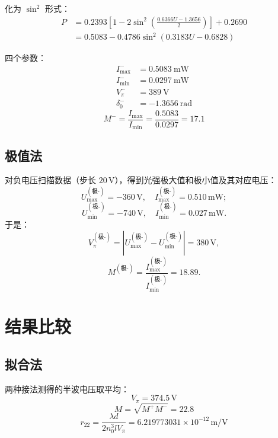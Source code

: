 \documentclass[10pt,twocolumn,a4paper]{article}
\begin{document}
	化为 $\sin^2$ 形式：
	\begin{equation}
		\begin{aligned}
			P &= 0.2393\left[1 - 2\sin^2\left(\frac{0.6366U - 1.3656}{2}\right)\right] + 0.2690 \\
			&= 0.5083 - 0.4786\sin^2(0.3183U - 0.6828)
		\end{aligned}
	\end{equation}
	
	四个参数：
	\begin{align}
		I_{\max}^- &= 0.5083\ \text{mW} \\
		I_{\min}^- &= 0.0297\ \text{mW} \\
		V_\pi^- &= 389\ \text{V} \\
		\delta_0^- &= -1.3656\ \text{rad}
	\end{align}
	\begin{equation}
		M^- = \frac{I_{\max}}{I_{\min}} = \frac{0.5083}{0.0297}=17.1
	\end{equation}
	
	\subsection{极值法}
	对负电压扫描数据（步长 \(20\,\text{V}\)），得到光强极大值和极小值及其对应电压：
	\begin{equation}
		U_{\text{max}}^{(\text{极-})} = -360\,\text{V},\quad I_{\text{max}}^{(\text{极-})} = 0.510\,\text{mW};
	\end{equation}
	\begin{equation}
		U_{\text{min}}^{(\text{极-})} = -740\,\text{V},\quad I_{\text{min}}^{(\text{极-})} = 0.027\,\text{mW}.
	\end{equation}
	于是：
	\begin{equation}
		V_{\pi}^{(\text{极-})} = \left| U_{\text{max}}^{(\text{极-})} - U_{\text{min}}^{(\text{极-})} \right| = 380\,\text{V},
	\end{equation}
	\begin{equation}
		M^{(\text{极-})} = \frac{I_{\text{max}}^{(\text{极-})}}{I_{\text{min}}^{(\text{极-})}} = 18.89.
	\end{equation}
	
	\section{结果比较}\label{sec:compare}
	\subsection{拟合法}
	两种接法测得的半波电压取平均：
	\begin{equation}
		\boxed{V_\pi = 374.5\,\text{V}}
	\end{equation}
	\begin{equation}
		\boxed{M = \sqrt{M^+M^-} = 22.8}
	\end{equation}
	\begin{equation}
		\boxed{r_{22} = \frac{\lambda d}{2n_0^3 l V_{\pi}} = 6.219773031\times10^{-12}\,\text{m/V}}
	\end{equation}
	
\end{document}
